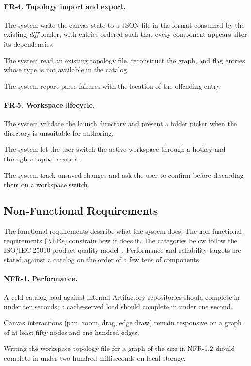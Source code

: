 \pagebreak

\paragraph{FR-4. Topology import and export.}
\begin{reqlist}
    \item[FR-4.1.] The system write the canvas state to a JSON file in the format consumed by the existing \textit{diff} loader, with entries ordered such that every component appears after its dependencies.
    \item[FR-4.2.] The system read an existing topology file, reconstruct the graph, and flag entries whose type is not available in the catalog.
    \item[FR-4.3.] The system report parse failures with the location of the offending entry.
\end{reqlist}

\paragraph{FR-5. Workspace lifecycle.}
\begin{reqlist}
    \item[FR-5.1.] The system validate the launch directory and present a folder picker when the directory is unsuitable for authoring.
    \item[FR-5.2.] The system let the user switch the active workspace through a hotkey and through a topbar control.
    \item[FR-5.3.] The system track unsaved changes and ask the user to confirm before discarding them on a workspace switch.
\end{reqlist}

\subsection{Non-Functional Requirements}
\label{sec:nfrs}

The functional requirements describe what the system does. The non-functional requirements (NFRs) constrain how it does it. The categories below follow the ISO/IEC 25010 product-quality model~\cite{iso25010}. Performance and reliability targets are stated against a catalog on the order of a few tens of components.

\paragraph{NFR-1. Performance.}
\begin{reqlist}
    \item[NFR-1.1.] A cold catalog load against internal Artifactory repositories should complete in under ten seconds; a cache-served load should complete in under one second.
    \item[NFR-1.2.] Canvas interactions (pan, zoom, drag, edge draw) remain responsive on a graph of at least fifty nodes and one hundred edges.
    \item[NFR-1.3.] Writing the workspace topology file for a graph of the size in NFR-1.2 should complete in under two hundred milliseconds on local storage.
\end{reqlist}

